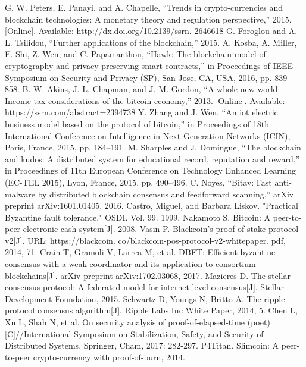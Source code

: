 \documentclass[doublespacing]{bmcart}
\begin{document}
\begin{CJK*}{UTF8}{gbsn}
	\begin{thebibliography}{99}
	G. W. Peters, E. Panayi, and A. Chapelle, “Trends in crypto-currencies and blockchain technologies: A monetary theory and regulation perspective,” 2015. [Online]. Available: http://dx.doi.org/10.2139/ssrn. 2646618
G. Foroglou and A.-L. Tsilidou, “Further applications of the blockchain,” 2015.
A. Kosba, A. Miller, E. Shi, Z. Wen, and C. Papamanthou, “Hawk: The blockchain model of cryptography and privacy-preserving smart contracts,” in Proceedings of IEEE Symposium on Security and Privacy (SP), San Jose, CA, USA, 2016, pp. 839–858.
B. W. Akins, J. L. Chapman, and J. M. Gordon, “A whole new world: Income tax considerations of the bitcoin economy,” 2013. [Online]. Available: https://ssrn.com/abstract=2394738
Y. Zhang and J. Wen, “An iot electric business model based on the protocol of bitcoin,” in Proceedings of 18th International Conference on Intelligence in Next Generation Networks (ICIN), Paris, France, 2015, pp. 184–191.
M. Sharples and J. Domingue, “The blockchain and kudos: A distributed system for educational record, reputation and reward,” in Proceedings of 11th European Conference on Technology Enhanced Learning (EC-TEL 2015), Lyon, France, 2015, pp. 490–496.
C. Noyes, “Bitav: Fast anti-malware by distributed blockchain consensus
and feedforward scanning,” arXiv preprint arXiv:1601.01405, 2016.
 Castro, Miguel, and Barbara Liskov. "Practical Byzantine fault tolerance." OSDI. Vol. 99. 1999.
 Nakamoto S. Bitcoin: A peer-to-peer electronic cash system[J]. 2008.
 Vasin P. Blackcoin’s proof-of-stake protocol v2[J]. URL: https://blackcoin. co/blackcoin-pos-protocol-v2-whitepaper. pdf, 2014, 71.
 Crain T, Gramoli V, Larrea M, et al. DBFT: Efficient byzantine consensus with a weak coordinator and its application to consortium blockchains[J]. arXiv preprint arXiv:1702.03068, 2017.
 Mazieres D. The stellar consensus protocol: A federated model for internet-level consensus[J]. Stellar Development Foundation, 2015.
 Schwartz D, Youngs N, Britto A. The ripple protocol consensus algorithm[J]. Ripple Labs Inc White Paper, 2014, 5.
 Chen L, Xu L, Shah N, et al. On security analysis of proof-of-elapsed-time (poet)[C]//International Symposium on Stabilization, Safety, and Security of Distributed Systems. Springer, Cham, 2017: 282-297.
 P4Titan. Slimcoin: A peer-to-peer crypto-currency with proof-of-burn, 2014.

\end{thebibliography}
\end{CJK*}
\end{document}
